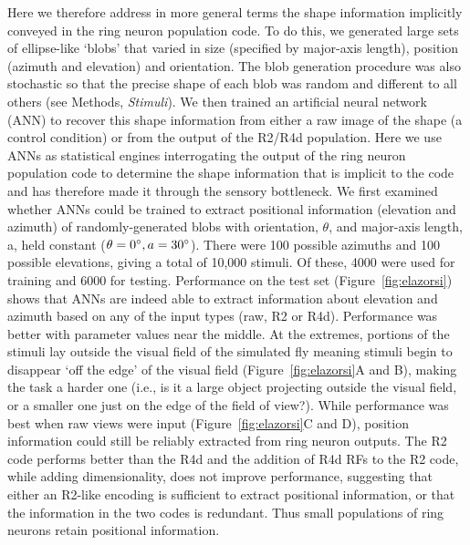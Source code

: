 \documentclass[10pt]{article}
\begin{document}
Here we therefore address in more general terms the shape information implicitly conveyed in the ring neuron population code. To do this, we generated large sets of ellipse-like ‘blobs’  that varied in size (specified by major-axis length), position (azimuth and elevation) and orientation. The blob generation procedure was also stochastic so that the precise shape of each blob was random and different to all others (see Methods, \emph{Stimuli}). We then trained an artificial neural network (ANN) to recover this shape information from either a raw image of the shape (a control condition) or from the output of the R2/R4d population. Here we use ANNs as statistical engines interrogating the output of the ring neuron population code to determine the shape information that is implicit to the code and has therefore made it through the sensory bottleneck. 
We first examined whether ANNs could be trained to extract positional information (elevation and azimuth) of randomly-generated blobs with orientation, $\theta$, and major-axis length, a, held constant ($\theta=0\degree, a = 30\degree$). There were 100 possible azimuths and 100 possible elevations, giving a total of 10,000 stimuli. Of these, 4000 were used for training and 6000 for testing. Performance on the test set (Figure~\ref{fig:elazorsi}) shows that ANNs are indeed able to extract information about elevation and azimuth based on any of the input types (raw, R2 or R4d). Performance was better with parameter values near the middle. At the extremes, portions of the stimuli lay outside the visual field of the simulated fly meaning stimuli begin to disappear ‘off the edge’ of the visual field (Figure~\ref{fig:elazorsi}A and B), making the task a harder one (i.e., is it a large object projecting outside the visual field, or a smaller one just on the edge of the field of view?). While performance was best when raw views were input (Figure~\ref{fig:elazorsi}C and D), position information could still be reliably extracted from ring neuron outputs. The R2 code performs better than the R4d and the addition of R4d RFs to the R2 code, while adding dimensionality, does not improve performance, suggesting that either an R2-like encoding is sufficient to extract positional information, or that the information in the two codes is redundant. Thus small populations of ring neurons retain positional information.
\end{document}
